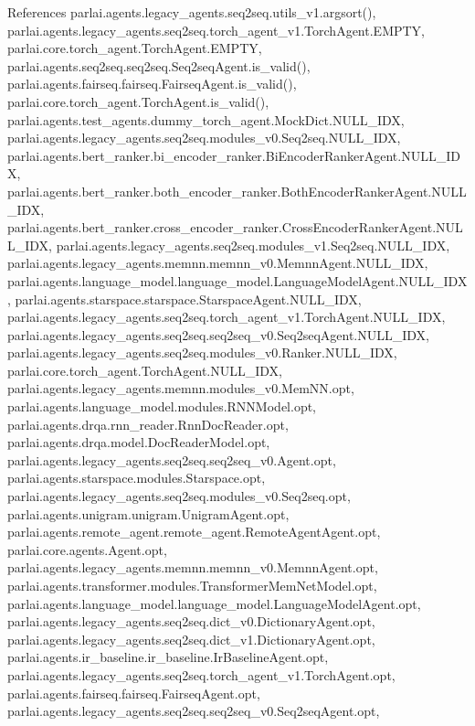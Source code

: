 References parlai.\+agents.\+legacy\+\_\+agents.\+seq2seq.\+utils\+\_\+v1.\+argsort(), parlai.\+agents.\+legacy\+\_\+agents.\+seq2seq.\+torch\+\_\+agent\+\_\+v1.\+Torch\+Agent.\+E\+M\+P\+TY, parlai.\+core.\+torch\+\_\+agent.\+Torch\+Agent.\+E\+M\+P\+TY, parlai.\+agents.\+seq2seq.\+seq2seq.\+Seq2seq\+Agent.\+is\+\_\+valid(), parlai.\+agents.\+fairseq.\+fairseq.\+Fairseq\+Agent.\+is\+\_\+valid(), parlai.\+core.\+torch\+\_\+agent.\+Torch\+Agent.\+is\+\_\+valid(), parlai.\+agents.\+test\+\_\+agents.\+dummy\+\_\+torch\+\_\+agent.\+Mock\+Dict.\+N\+U\+L\+L\+\_\+\+I\+DX, parlai.\+agents.\+legacy\+\_\+agents.\+seq2seq.\+modules\+\_\+v0.\+Seq2seq.\+N\+U\+L\+L\+\_\+\+I\+DX, parlai.\+agents.\+bert\+\_\+ranker.\+bi\+\_\+encoder\+\_\+ranker.\+Bi\+Encoder\+Ranker\+Agent.\+N\+U\+L\+L\+\_\+\+I\+DX, parlai.\+agents.\+bert\+\_\+ranker.\+both\+\_\+encoder\+\_\+ranker.\+Both\+Encoder\+Ranker\+Agent.\+N\+U\+L\+L\+\_\+\+I\+DX, parlai.\+agents.\+bert\+\_\+ranker.\+cross\+\_\+encoder\+\_\+ranker.\+Cross\+Encoder\+Ranker\+Agent.\+N\+U\+L\+L\+\_\+\+I\+DX, parlai.\+agents.\+legacy\+\_\+agents.\+seq2seq.\+modules\+\_\+v1.\+Seq2seq.\+N\+U\+L\+L\+\_\+\+I\+DX, parlai.\+agents.\+legacy\+\_\+agents.\+memnn.\+memnn\+\_\+v0.\+Memnn\+Agent.\+N\+U\+L\+L\+\_\+\+I\+DX, parlai.\+agents.\+language\+\_\+model.\+language\+\_\+model.\+Language\+Model\+Agent.\+N\+U\+L\+L\+\_\+\+I\+DX, parlai.\+agents.\+starspace.\+starspace.\+Starspace\+Agent.\+N\+U\+L\+L\+\_\+\+I\+DX, parlai.\+agents.\+legacy\+\_\+agents.\+seq2seq.\+torch\+\_\+agent\+\_\+v1.\+Torch\+Agent.\+N\+U\+L\+L\+\_\+\+I\+DX, parlai.\+agents.\+legacy\+\_\+agents.\+seq2seq.\+seq2seq\+\_\+v0.\+Seq2seq\+Agent.\+N\+U\+L\+L\+\_\+\+I\+DX, parlai.\+agents.\+legacy\+\_\+agents.\+seq2seq.\+modules\+\_\+v0.\+Ranker.\+N\+U\+L\+L\+\_\+\+I\+DX, parlai.\+core.\+torch\+\_\+agent.\+Torch\+Agent.\+N\+U\+L\+L\+\_\+\+I\+DX, parlai.\+agents.\+legacy\+\_\+agents.\+memnn.\+modules\+\_\+v0.\+Mem\+N\+N.\+opt, parlai.\+agents.\+language\+\_\+model.\+modules.\+R\+N\+N\+Model.\+opt, parlai.\+agents.\+drqa.\+rnn\+\_\+reader.\+Rnn\+Doc\+Reader.\+opt, parlai.\+agents.\+drqa.\+model.\+Doc\+Reader\+Model.\+opt, parlai.\+agents.\+legacy\+\_\+agents.\+seq2seq.\+seq2seq\+\_\+v0.\+Agent.\+opt, parlai.\+agents.\+starspace.\+modules.\+Starspace.\+opt, parlai.\+agents.\+legacy\+\_\+agents.\+seq2seq.\+modules\+\_\+v0.\+Seq2seq.\+opt, parlai.\+agents.\+unigram.\+unigram.\+Unigram\+Agent.\+opt, parlai.\+agents.\+remote\+\_\+agent.\+remote\+\_\+agent.\+Remote\+Agent\+Agent.\+opt, parlai.\+core.\+agents.\+Agent.\+opt, parlai.\+agents.\+legacy\+\_\+agents.\+memnn.\+memnn\+\_\+v0.\+Memnn\+Agent.\+opt, parlai.\+agents.\+transformer.\+modules.\+Transformer\+Mem\+Net\+Model.\+opt, parlai.\+agents.\+language\+\_\+model.\+language\+\_\+model.\+Language\+Model\+Agent.\+opt, parlai.\+agents.\+legacy\+\_\+agents.\+seq2seq.\+dict\+\_\+v0.\+Dictionary\+Agent.\+opt, parlai.\+agents.\+legacy\+\_\+agents.\+seq2seq.\+dict\+\_\+v1.\+Dictionary\+Agent.\+opt, parlai.\+agents.\+ir\+\_\+baseline.\+ir\+\_\+baseline.\+Ir\+Baseline\+Agent.\+opt, parlai.\+agents.\+legacy\+\_\+agents.\+seq2seq.\+torch\+\_\+agent\+\_\+v1.\+Torch\+Agent.\+opt, parlai.\+agents.\+fairseq.\+fairseq.\+Fairseq\+Agent.\+opt, parlai.\+agents.\+legacy\+\_\+agents.\+seq2seq.\+seq2seq\+\_\+v0.\+Seq2seq\+Agent.\+opt, 